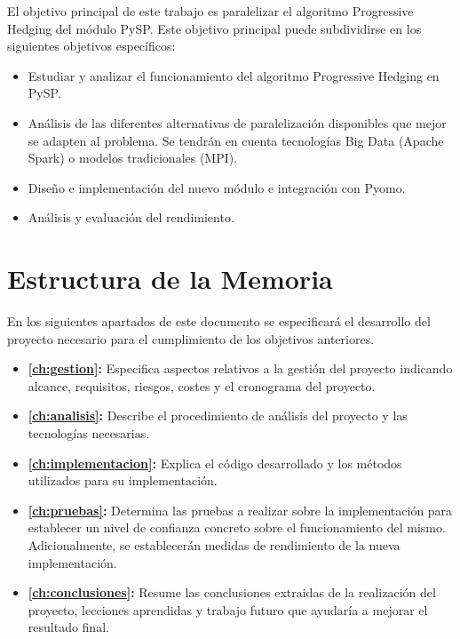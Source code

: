 
El objetivo principal de este trabajo es paralelizar el algoritmo Progressive Hedging del módulo PySP. Este objetivo principal puede subdividirse en los siguientes objetivos específicos:

\begin{itemize}
    \item Estudiar y analizar el funcionamiento del algoritmo Progressive Hedging en PySP.
    \item Análisis de las diferentes alternativas de paralelización disponibles que mejor se adapten al problema. Se tendrán en cuenta tecnologías Big Data (Apache Spark) o modelos tradicionales (MPI).
    \item Diseño e implementación del nuevo módulo e integración con Pyomo.
    \item Análisis y evaluación del rendimiento.
\end{itemize}

\section{Estructura de la Memoria}


En los siguientes apartados de este documento se especificará el desarrollo del proyecto necesario para el cumplimiento de los objetivos anteriores.

\begin{itemize}
    \item \textbf{\autoref{ch:gestion}: } Especifica aspectos relativos a la gestión del proyecto indicando alcance, requisitos, riesgos, costes y el cronograma del proyecto.
    \item \textbf{\autoref{ch:analisis}: } Describe el procedimiento de análisis del proyecto y las tecnologías necesarias.
    \item \textbf{\autoref{ch:implementacion}: } Explica el código desarrollado y los métodos utilizados para su implementación.
    \item \textbf{\autoref{ch:pruebas}: } Determina las pruebas a realizar sobre la implementación para establecer un nivel de confianza concreto sobre el funcionamiento del mismo. Adicionalmente, se establecerán medidas de rendimiento de la nueva implementación.
    \item \textbf{\autoref{ch:conclusiones}: } Resume las conclusiones extraidas de la realización del proyecto, lecciones aprendidas y trabajo futuro que ayudaría a mejorar el resultado final.
\end{itemize}